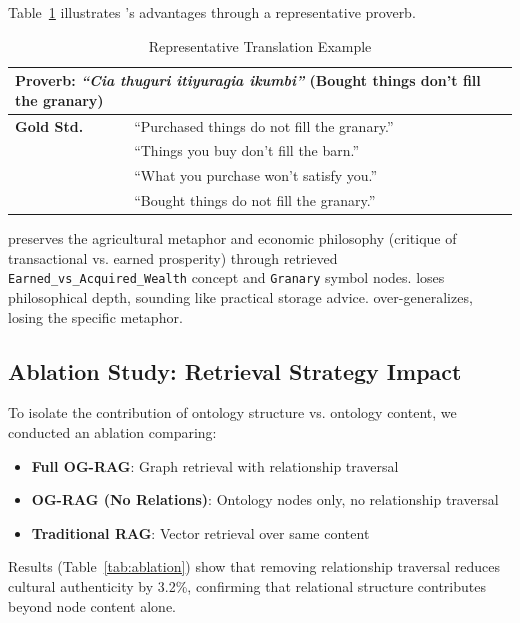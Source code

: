 Table~\ref{tab:example_translations} illustrates \ograg{}'s advantages through a representative proverb.

\begin{table}[t]
\centering
\caption{Representative Translation Example}
\label{tab:example_translations}
\small
\begin{tabular}{ll}
\toprule
\multicolumn{2}{l}{\textbf{Proverb}: \emph{``Cia thuguri itiyuragia ikumbi''} (Bought things don't fill the granary)} \\
\midrule
\textbf{Gold Std.} & ``Purchased things do not fill the granary.'' \\
\textbf{\raw{}} & ``Things you buy don't fill the barn.'' \\
\textbf{\trad{}} & ``What you purchase won't satisfy you.'' \\
\textbf{\ograg{}} & ``Bought things do not fill the granary.'' \\
\bottomrule
\end{tabular}
\end{table}

\ograg{} preserves the agricultural metaphor and economic philosophy (critique of transactional vs. earned prosperity) through retrieved \texttt{Earned\_vs\_Acquired\_Wealth} concept and \texttt{Granary} symbol nodes. \raw{} loses philosophical depth, sounding like practical storage advice. \trad{} over-generalizes, losing the specific metaphor.

\subsection{Ablation Study: Retrieval Strategy Impact}
\label{subsec:ablation}

To isolate the contribution of ontology structure vs. ontology content, we conducted an ablation comparing:
\begin{itemize}
    \item \textbf{Full OG-RAG}: Graph retrieval with relationship traversal
    \item \textbf{OG-RAG (No Relations)}: Ontology nodes only, no relationship traversal
    \item \textbf{Traditional RAG}: Vector retrieval over same content
\end{itemize}

Results (Table~\ref{tab:ablation}) show that removing relationship traversal reduces cultural authenticity by 3.2\%, confirming that relational structure contributes beyond node content alone.

